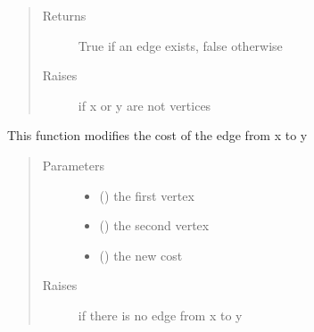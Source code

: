 \documentclass[letterpaper,10pt,english]{sphinxmanual}
\begin{document}
\begin{fulllineitems}
\begin{fulllineitems}
\begin{quote}
\begin{description}
\begin{itemize}
\end{itemize}

\item[{Returns}] \leavevmode
True if an edge exists, false otherwise

\item[{Raises}] \leavevmode
{} \textendash{} if x or y are not vertices

\end{description}\end{quote}

\end{fulllineitems}


\begin{fulllineitems}
\label{\detokenize{Graph:Graph.Graph.modify_edge_cost}}
This function modifies the cost of the edge from x to y
\begin{quote}\begin{description}
\item[{Parameters}] \leavevmode\begin{itemize}
\item {} 
 () \textendash{} the first vertex

\item {} 
 () \textendash{} the second vertex

\item {} 
 () \textendash{} the new cost

\end{itemize}

\item[{Raises}] \leavevmode
{} \textendash{} if there is no edge from x to y

\end{description}\end{quote}

\end{fulllineitems}



\end{fulllineitems}
\end{document}
